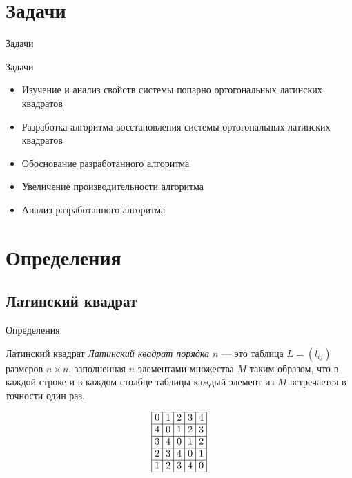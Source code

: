 \documentclass[8pt, hyperref={pdftex,unicode}]{beamer}
\newcommand{\LSfive}[1]{
    \begin{array}{|>{\hspace{-2pt}}c<{\hspace{-2pt}}|>{\hspace{-2pt}}c<{\hspace{-2pt}}|>{\hspace{-2pt}}c<{\hspace{-2pt}}|>{\hspace{-2pt}}c<{\hspace{-2pt}}|>{\hspace{-2pt}}c<{\hspace{-2pt}}|}\hline
        #1
    \end{array}
}
\begin{document}
\section{Задачи}
\begin{frame}{Задачи}

    \begin{block}{Задачи}
        \begin{itemize}
            \item Изучение и анализ свойств системы попарно ортогональных латинских квадратов
            \item Разработка алгоритма восстановления системы ортогональных латинских квадратов
            \item Обоснование разработанного алгоритма
            \item Увеличение производительности алгоритма
            \item Анализ разработанного алгоритма
        \end{itemize}
    \end{block}

\end{frame}


\section{Определения}
\subsection{Латинский квадрат}
\begin{frame}{Определения}

    \begin{block}{Латинский квадрат}
        {\it Латинский квадрат порядка $n$} — это таблица $L = (l_{ij})$ размеров $n\times n$, заполненная $n$ элементами множества $M$ таким образом, что в каждой строке и в каждом столбце таблицы каждый элемент из $M$ встречается в точности один раз.
    \end{block}

    $$
        \LSfive{0 & 1 & 2 & 3 & 4 \\ \hline
            4 & 0 & 1 & 2 & 3 \\ \hline
            3 & 4 & 0 & 1 & 2 \\ \hline
            2 & 3 & 4 & 0 & 1 \\ \hline
            1 & 2 & 3 & 4 & 0 \\ \hline}
    $$
\end{frame}
\end{document}
